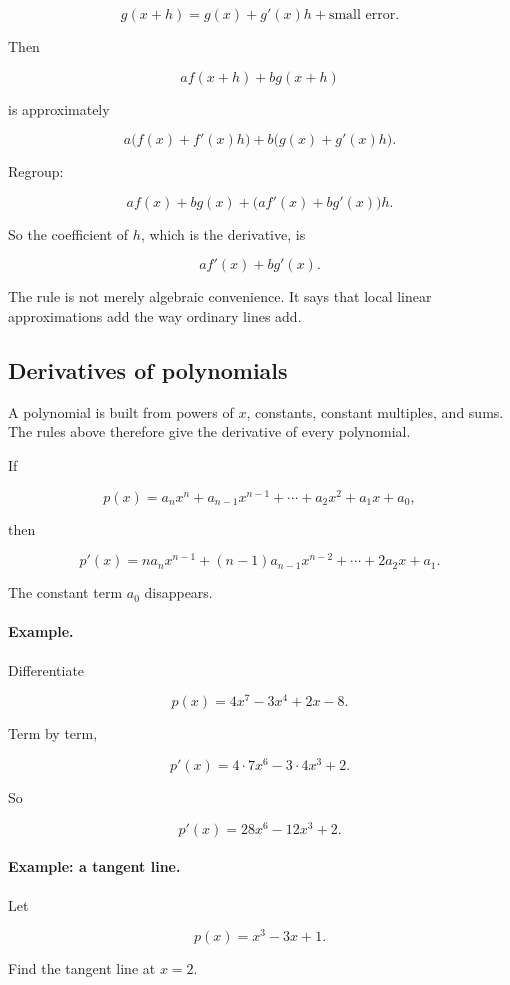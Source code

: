 \[
g(x+h)=g(x)+g'(x)h+\text{small error}.
\]

Then

\[
a f(x+h)+b g(x+h)
\]

is approximately

\[
a\bigl(f(x)+f'(x)h\bigr)
+
b\bigl(g(x)+g'(x)h\bigr).
\]

Regroup:

\[
a f(x)+b g(x)
+
\bigl(a f'(x)+b g'(x)\bigr)h.
\]

So the coefficient of \(h\), which is the derivative, is

\[
a f'(x)+b g'(x).
\]

The rule is not merely algebraic convenience.  It says that local linear approximations add the way ordinary lines add.

\subsection{Derivatives of polynomials}
\label{subsec:polynomial-derivatives-ch5}

A polynomial is built from powers of \(x\), constants, constant multiples, and sums.  The rules above therefore give the derivative of every polynomial.

If

\[
p(x)=a_nx^n+a_{n-1}x^{n-1}+\cdots+a_2x^2+a_1x+a_0,
\]

then

\[
\boxed{
p'(x)
=
na_nx^{n-1}+(n-1)a_{n-1}x^{n-2}+\cdots+2a_2x+a_1.
}
\]

The constant term \(a_0\) disappears.

\paragraph{Example.}
Differentiate

\[
p(x)=4x^7-3x^4+2x-8.
\]

Term by term,

\[
p'(x)=4\cdot7x^6-3\cdot4x^3+2.
\]

So

\[
\boxed{
p'(x)=28x^6-12x^3+2.
}
\]

\paragraph{Example: a tangent line.}
Let

\[
p(x)=x^3-3x+1.
\]

Find the tangent line at \(x=2\).

